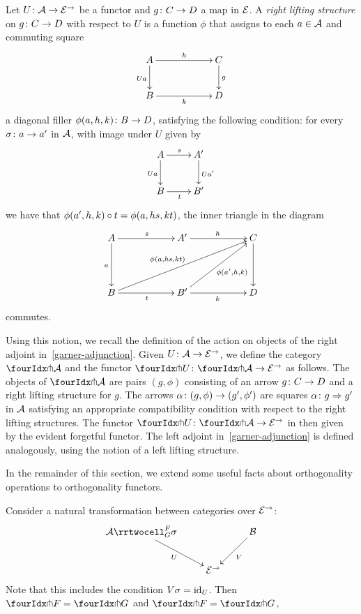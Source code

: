 \documentclass[reqno,10pt,a4paper,oneside]{amsart}
\begin{document}
 
 \begin{definition} Let $U \co \cal{A} \to \catE^\to$ be a functor and $g \co C \to D$ a map in $\catE$. 
 A \emph{right lifting structure} on $g \co C \to D$ with respect to $U$ is 
 a function  $\phi$ that assigns to each $a \in \cal{A}$ and commuting square
\[
\xymatrix@C=2cm{
A \ar[r]^{h}   \ar[d]_{U a} & C \ar[d]^g \\
B \ar[r]_{k} & D}
\]
a diagonal filler $\phi(a, h, k) \co B \to D$, satisfying the following condition: for every $\sigma \co a \to a'$ in $\cal{A}$, 
with image under $U$ given by
\[
\xymatrix{
A \ar[r]^s \ar[d]_{Ua} & A' \ar[d]^{U a'}  \\
B \ar[r]_{t} & B'}
\]
we have that $\phi(a', h, k) \cc t = \phi(a, hs, kt)$, \ie the inner triangle in the diagram
\[
\xymatrix@C=2cm@R=1.5cm{
A \ar[r]^s \ar[d]_a & A' \ar[r]^{h}  & C \ar[d]   \\
B \ar[r]_{t}  \ar[urr]^{\phi(a, hs, k t) \quad } & B'  \ar[r]_k  \ar[ur]_{\phi(a', h, k)} & D }
\]
commutes. 
\end{definition}
 
 Using this notion, we recall the definition of the action on objects of the right adjoint in~\eqref{garner-adjunction}. 
 Given $U \co \cal{A} \to \catE^\to$, we define the category $\liftr{\cal{A}}$ and the functor 
  $\liftr{U} \co \liftr{\cal{A}} \to \catE^\to$ as follows. The objects of
$ \liftr{\cal{A}}$ are pairs $(g, \phi)$ consisting of an arrow $g \co C \to D$ and a right lifting structure for $g$.
The arrows $\alpha \co (g, \phi) \to (g', \phi')$ are squares $\alpha \co g \Rightarrow g'$ in $\cal{A}$ satisfying an appropriate compatibility condition
with respect to the right lifting structures. The functor $\liftr{U} \co \liftr{\cal{A}} \to \catE^\to$ in then given by
the evident forgetful functor. The left adjoint in~\eqref{garner-adjunction} is defined analogously, using the
notion of a left lifting structure.

\medskip

In the remainder of this section, we extend some useful facts about orthogonality operations to orthogonality functors.


\begin{lemma}
Consider a natural transformation between categories over $\catE^{\to}$:
\[
\xymatrix{
  \cal{A}
  \rrtwocell_G^F{\sigma}
 \ar[dr]_{U}
&&
  \cal{B}
  \ar[dl]^{V}
\\&
  \catE^{\to}
}
\]
Note that this includes the condition $V \sigma = \id_U$.
Then $\liftr{F} = \liftr{G}$ and $\liftl{F} = \liftl{G}$, 
\end{lemma}
\end{document}
